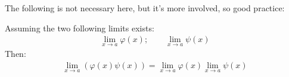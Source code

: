 \documentclass[solutions.tex]{subfiles}
\begin{document}
The following is not necessary here, but it's more involved, so good
practice:
\begin{theorem} Assuming the two following limits
exists:
\begin{equation*} \begin{aligned}
	\lim_{x \rightarrow a}\varphi(x);\qquad\lim_{x \rightarrow a}\psi(x)
\end{aligned} \end{equation*}
Then:
\begin{equation*} \begin{aligned}
	\boxed{\lim_{x \rightarrow a}\left(\varphi(x)\psi(x)\right) =
		\lim_{x \rightarrow a}\varphi(x)\lim_{x \rightarrow a}\psi(x)}
\end{aligned} \end{equation*}
\end{theorem}
\end{document}
